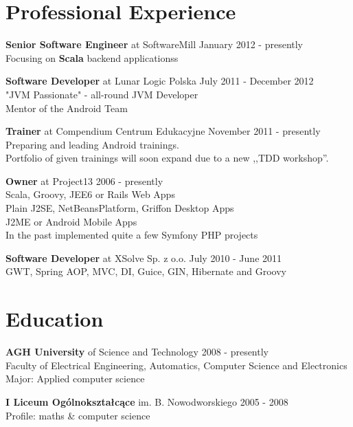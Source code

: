 \documentclass{res}
\begin{document}
\begin{resume} 

\section{Professional Experience}
{\bf Senior Software Engineer} at SoftwareMill \hfill January 2012 - presently \\ 
    Focusing on \textbf{Scala} backend applicationss
    
{\bf Software Developer} at Lunar Logic Polska \hfill July 2011 - December 2012 \\ 
    "JVM Passionate" - all-round JVM Developer \\ 
    Mentor of the Android Team 

{\bf Trainer} at Compendium Centrum Edukacyjne \hfill November 2011 - presently \\ 
	Preparing and leading Android trainings. \\
	Portfolio of given trainings will soon expand due to a new ,,TDD workshop''. 

{\bf Owner} at Project13 \hfill 2006 - presently\\
	Scala, Groovy, JEE6 or Rails Web Apps \\
	Plain J2SE, NetBeansPlatform, Griffon Desktop Apps \\
	J2ME or Android Mobile Apps \\
	In the past implemented quite a few Symfony PHP projects


{\bf Software Developer} at XSolve Sp. z o.o. \hfill July 2010 - June 2011\\
	GWT, Spring {AOP, MVC, DI}, Guice, GIN, Hibernate and Groovy

\section{Education} 
{\bf AGH University} of Science and Technology \hfill 2008 - presently\\
	Faculty of Electrical Engineering, Automatics, Computer Science and Electronics\\
	Major: Applied computer science

{\bf I Liceum Ogólnokształcące} im. B. Nowodworskiego \hfill 2005 - 2008\\
	Profile: maths \& computer science


\end{resume}
\end{document}
